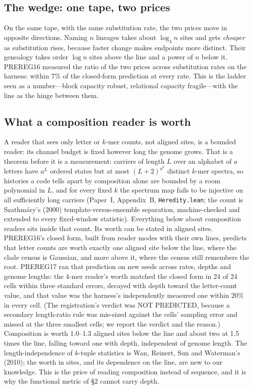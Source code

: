 \documentclass[11pt]{article}
\begin{document}
\subsection{The wedge: one tape, two prices}

On the same tape, with the same substitution rate, the two prices move in opposite directions. Naming $n$ lineages takes about $\log_4 n$ sites and gets \emph{cheaper} as substitution rises, because faster change makes endpoints more distinct. Their genealogy takes order $\log n$ sites above the line and a power of $n$ below it. PREREG16 measured the ratio of the two prices across substitution rates on the harness: within 7\% of the closed-form prediction at every rate. This is the ladder seen as a number---block capacity robust, relational capacity fragile---with the line as the hinge between them.

\subsection{What a composition reader is worth}

A reader that sees only letter or $k$-mer counts, not aligned sites, is a bounded reader: its channel budget is fixed however long the genome grows. That is a theorem before it is a measurement: carriers of length $L$ over an alphabet of $a$ letters have $a^L$ ordered states but at most $(L+2)^{a^k}$ distinct $k$-mer spectra, so histories a code tells apart by composition alone are bounded by a room polynomial in $L$, and for every fixed $k$ the spectrum map fails to be injective on all sufficiently long carriers (Paper~I, Appendix~B, \texttt{Heredity.lean}; the count is Szathmáry's (2000) template-versus-ensemble separation, machine-checked and extended to every fixed-window statistic). Everything below about composition readers sits inside that count. Its worth can be stated in aligned sites. PREREG16's closed form, built from reader modes with their own lines, predicts that letter counts are worth exactly one aligned site below the line, where the clade census is Gaussian, and more above it, where the census still remembers the root. PREREG17 ran that prediction on new seeds across rates, depths and genome lengths: the 4-mer reader's worth matched the closed form in 24 of 24 cells within three standard errors, decayed with depth toward the letter-count value, and that value was the harness's independently measured one within 20\% in every cell. (The registration's verdict was NOT PREDICTED, because a secondary length-ratio rule was mis-sized against the cells' sampling error and missed at the three smallest cells; we report the verdict and the reason.) Composition is worth 1.0--1.3 aligned sites below the line and about two at 1.5 times the line, falling toward one with depth, independent of genome length. The length-independence of $k$-tuple statistics is Wan, Reinert, Sun and Waterman's (2010); the worth in sites, and its dependence on the line, are new to our knowledge. This is the price of reading composition instead of sequence, and it is why the functional metric of \S2 cannot carry depth.
\end{document}
